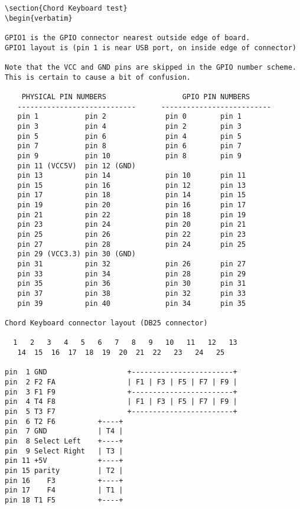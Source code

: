 \begin{verbatim}
\section{Chord Keyboard test}
\begin{verbatim}

GPIO1 is the GPIO connector nearest outside edge of board.
GPIO1 layout is (pin 1 is near USB port, on inside edge of connector)

Note that the VCC and GND pins are skipped in the GPIO number scheme.
This is certain to cause a bit of confusion.

    PHYSICAL PIN NUMBERS                  GPIO PIN NUMBERS
   ----------------------------      --------------------------
   pin 1           pin 2              pin 0        pin 1
   pin 3           pin 4              pin 2        pin 3
   pin 5           pin 6              pin 4        pin 5
   pin 7           pin 8              pin 6        pin 7
   pin 9           pin 10             pin 8        pin 9
   pin 11 (VCC5V)  pin 12 (GND)
   pin 13          pin 14             pin 10       pin 11
   pin 15          pin 16             pin 12       pin 13
   pin 17          pin 18             pin 14       pin 15
   pin 19          pin 20             pin 16       pin 17
   pin 21          pin 22             pin 18       pin 19
   pin 23          pin 24             pin 20       pin 21
   pin 25          pin 26             pin 22       pin 23
   pin 27          pin 28             pin 24       pin 25
   pin 29 (VCC3.3) pin 30 (GND)
   pin 31          pin 32             pin 26       pin 27
   pin 33          pin 34             pin 28       pin 29
   pin 35          pin 36             pin 30       pin 31
   pin 37          pin 38             pin 32       pin 33
   pin 39          pin 40             pin 34       pin 35

Chord Keyboard connector layout (DB25 connector)

  1   2   3   4   5   6   7   8   9   10   11   12   13
   14  15  16  17  18  19  20  21  22   23   24   25

pin  1 GND                   +------------------------+
pin  2 F2 FA                 | F1 | F3 | F5 | F7 | F9 |
pin  3 F1 F9                 +------------------------+
pin  4 T4 F8                 | F1 | F3 | F5 | F7 | F9 |
pin  5 T3 F7                 +------------------------+
pin  6 T2 F6          +----+
pin  7 GND            | T4 |
pin  8 Select Left    +----+
pin  9 Select Right   | T3 |
pin 11 +5V            +----+              
pin 15 parity         | T2 | 
pin 16    F3          +----+  
pin 17    F4          | T1 |
pin 18 T1 F5          +----+   
               

\end{verbatim}
